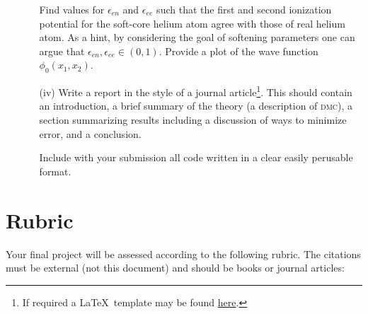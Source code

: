 \documentclass[letterpaper, 11 pt]{article}
\begin{document}
\begin{itemize}
\begin{itemize}
            Find values for $\epsilon_{en}$ and $\epsilon_{ee}$ such that the first and second
            ionization potential for the soft-core helium atom agree with those of real helium atom.
            As a hint, by considering the goal of softening parameters one can argue that
            $\epsilon_{en}, \epsilon_{ee} \in (0,1)$. Provide a plot of the wave function
            $\phi_0(x_1, x_2)$.

         \item[(iv)] Write a report in the style of a journal article\footnote{If required a \LaTeX\
            template may be found \href{https://journals.aps.org/revtex}{here}.}. This should contain an
            introduction, a brief summary of the theory (a  description of \textsc{dmc}), a section
            summarizing results including a discussion of ways to minimize error, and a conclusion.

            Include with your submission all code written in a clear easily perusable format.

      \end{itemize}

\end{itemize}

\section*{Rubric}

Your final project will be assessed according to the following rubric. The citations must be external
(not this document) and should be books or journal articles:

\printbibliography[title=References]
\end{document}
